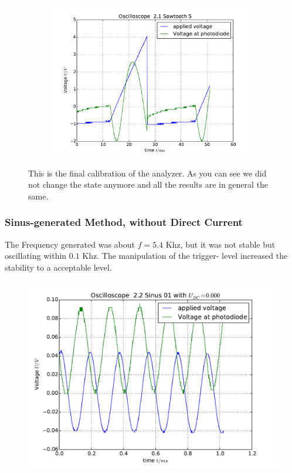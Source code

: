 \begin{figure}
\begin{subfigure}[b]{\picwidth}
        \includegraphics[width=\textwidth]{analysis/figures/21sawtooth5}
        \caption{}
    \end{subfigure}
    \caption{
        This is the final calibration of the analyzer. As you
        can see we did not change the state anymore and all the
        results are in general the same.
        }
    \label{fig:saw3}
\end{figure}
\flushleft
\clearpage
\subsubsection{Sinus-generated Method, without Direct Current}
The Frequency generated was about $f=5.4$ Khz, but it was not stable
but oscillating within $0.1$ Khz. The manipulation of the trigger-
level increased the stability to a acceptable level. 
\begin{figure}
\includegraphics[width=15cm]{analysis/figures/22sinus01}
\end{figure}
